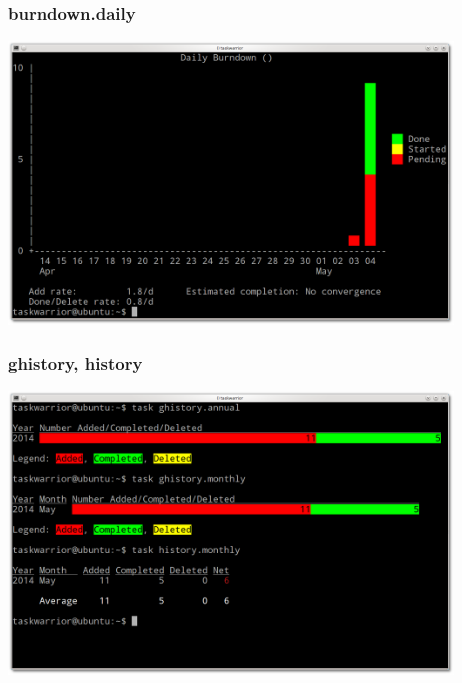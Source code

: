 \documentclass[t,handout]{beamer}
\begin{document}
\begin{frame}[fragile]\frametitle{burndown.daily}
\begin{center} %
\includegraphics[width=11.8cm,height=7.5cm]{burndown-daily.png}
\end{center}
\end{frame}

\begin{frame}[fragile]\frametitle{ghistory, history}
\begin{center} %
\includegraphics[width=11.8cm,height=7.5cm]{ghistory-history.png}
\end{center}
\end{frame}
\end{document}
